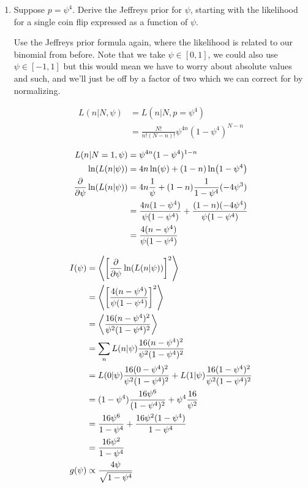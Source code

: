 \begin{enumerate}[label=\textbf{\Alph*}.]
    \item Suppose $p = \psi^4$. Derive the Jeffreys prior for $\psi$, starting with the likelihood for a single coin flip expressed as a function of $\psi$.
    
    Use the Jeffreys prior formula again, where the likelihood is related to our binomial from before. Note that we take $\psi \in [0, 1]$, we could also use $\psi \in [-1, 1]$ but this would mean we have to worry about absolute values and such, and we'll just be off by a factor of two which we can correct for by normalizing.

    \begin{align*}
        L(n|N, \psi) &= L(n|N, p=\psi^4) \\
        &= \frac{N!}{n!(N-n)!} \psi^{4n} (1-\psi^4)^{N-n} \\
    \end{align*}
    \begin{align*}
        L(n|N=1, \psi) &= \psi^{4n} (1-\psi^4)^{1-n} \\
        \ln(L(n|\psi)) &= 4n\ln(\psi) + (1-n)\ln(1-\psi^4) \\
        \frac{\partial}{\partial \psi} \ln(L(n|\psi)) &= 4n\frac{1}{\psi} + (1-n)\frac{1}{1-\psi^4}(-4\psi^3) \\
        &= \frac{4n(1-\psi^4)}{\psi(1-\psi^4)} + \frac{(1-n)(-4\psi^4)}{\psi(1-\psi^4)} \\
        &= \frac{4(n-\psi^4)}{\psi(1-\psi^4)} \\
    \end{align*}

    \begin{align*}
        I(\psi) &=  \left< \left[\frac{\partial}{\partial \psi} \ln(L(n|\psi))\right]^2 \right> \\
        &= \left< \left[\frac{4(n-\psi^4)}{\psi(1-\psi^4)}\right]^2 \right> \\
        &= \left< \frac{16(n-\psi^4)^2}{\psi^2(1-\psi^4)^2} \right> \\
        &= \sum_n L(n|\psi) \frac{16(n-\psi^4)^2}{\psi^2(1-\psi^4)^2} \\
        &= L(0|\psi) \frac{16(0-\psi^4)^2}{\psi^2(1-\psi^4)^2} + L(1|\psi) \frac{16(1-\psi^4)^2}{\psi^2(1-\psi^4)^2} \\
        &= (1-\psi^4) \frac{16\psi^6}{(1-\psi^4)^2} + \psi^4 \frac{16}{\psi^2} \\
        &= \frac{16\psi^6}{1-\psi^4} +  \frac{16\psi^2(1-\psi^4)}{1-\psi^4} \\
        &= \frac{16\psi^2}{1-\psi^4} \\
        g(\psi) &\propto \frac{4\psi}{\sqrt{1-\psi^4}} \\
    \end{align*}


\end{enumerate}
